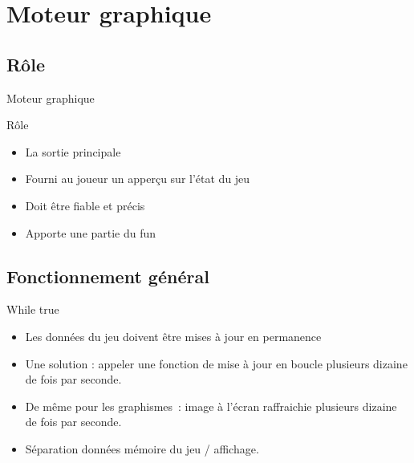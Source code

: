 \section{Moteur graphique}

\subsection{Rôle}
\begin{frame}{Moteur graphique}
  \begin{block}{Rôle}
    \begin{itemize}
      \item La sortie principale
      \item Fourni au joueur un apperçu sur l’état du jeu
      \item Doit être fiable et précis
      \item Apporte une partie du fun
    \end{itemize}
  \end{block}
\end{frame}

\subsection{Fonctionnement général}
\begin{frame}
  \begin{block}{While true}
    \begin{itemize}
      \item Les données du jeu doivent être mises à jour en permanence
      \item Une solution : appeler une fonction de mise à jour en boucle
      plusieurs dizaine de fois par seconde.
      \item De même pour les graphismes~: image à l'écran raffraichie
      plusieurs dizaine de fois par seconde.
      \item Séparation données mémoire du jeu / affichage.
    \end{itemize}
  \end{block}
\end{frame}

